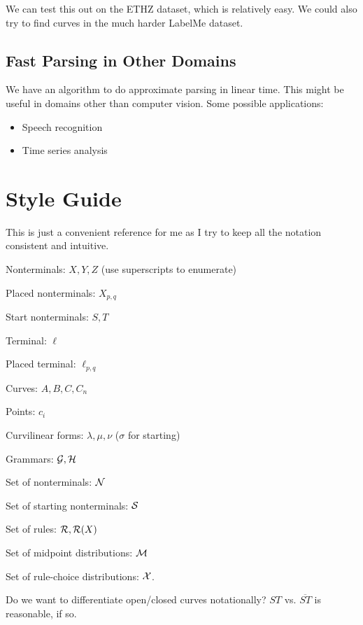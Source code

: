 \documentclass{article}
\begin{document}
We can test this out on the ETHZ dataset, which is relatively easy. We
could also try to find curves in the much harder LabelMe dataset.

\subsection{Fast Parsing in Other Domains}

We have an algorithm to do approximate parsing in linear time. This
might be useful in domains other than computer vision. Some possible
applications:
\begin{itemize}
\item Speech recognition
\item Time series analysis
\end{itemize}

\section{Style Guide}

This is just a convenient reference for me as I try to keep all the
notation consistent and intuitive.

\bitem
\item Nonterminals: $X,Y,Z$ (use superscripts to enumerate)
\item Placed nonterminals: $X_{p,q}$
\item Start nonterminals: $S,T$
\item Terminal: $\ell$
\item Placed terminal: $\ell_{p,q}$
\item Curves: $A,B,C, C_n$
\item Points: $c_i$
\item Curvilinear forms: $\lambda, \mu, \nu$ ($\sigma$ for starting)
\item Grammars: ${\mathcal G}, {\mathcal H}$
\item Set of nonterminals: ${\mathcal N}$
\item Set of starting nonterminals: ${\mathcal S}$
\item Set of rules: ${\mathcal R}, {\mathcal R}(X)$
\item Set of midpoint distributions: ${\mathcal M}$
\item Set of rule-choice distributions: ${\mathcal X}$.
\item Do we want to differentiate open/closed curves notationally?
$ST$ vs. $\overline{ST}$ is reasonable, if so.
\eitem




\end{document}
